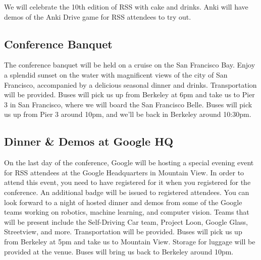 We will celebrate the 10th edition of RSS with cake and drinks. Anki will have demos of the Anki Drive game for RSS attendees to try out.

\vspace{3mm}
\subsection*{Conference Banquet}
The conference banquet will be held on a cruise on the San Francisco Bay. Enjoy a splendid sunset on the water with magnificent views of the city of San Francisco, accompanied by a delicious seasonal dinner and drinks. Transportation will be provided. Buses will pick us up from Berkeley at 6pm and take us to Pier 3 in San Francisco, where we will board the San Francisco Belle. Buses will pick us up from Pier 3 around 10pm, and we'll be back in Berkeley around 10:30pm.

\vspace{3mm}
\subsection*{Dinner \& Demos at Google HQ}
On the last day of the conference, Google will be hosting a special evening event for RSS attendees at the Google Headquarters in Mountain View. In order to attend this event, you need to have registered for it when you registered for the conference. An additional badge will be issued to registered attendees. You can look forward to a night of hosted dinner and demos from some of the Google teams working on robotics, machine learning, and computer vision. Teams that will be present include the Self-Driving Car team, Project Loon, Google Glass, Streetview, and more. Transportation will be provided. Buses will pick us up from Berkeley at 5pm and take us to Mountain View. Storage for luggage will be provided at the venue. Buses will bring us back to Berkeley around 10pm.

\setlength\fboxrule{0pt}



